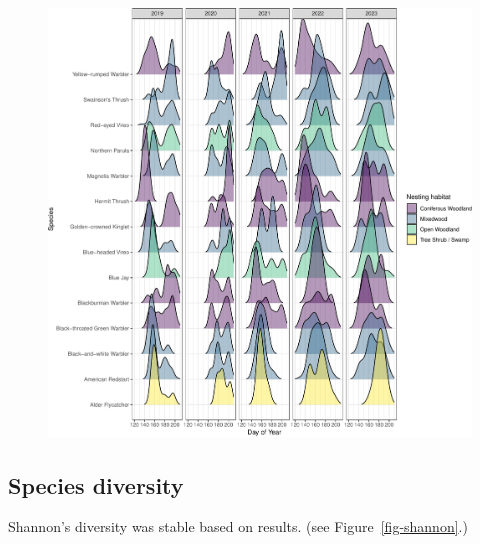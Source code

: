 \documentclass[
  letterpaper,
  DIV=11,
  numbers=noendperiod,
  oneside]{scrartcl}
\begin{document}
\begin{figure}


{\centering \includegraphics{peinp_files/figure-pdf/fig-spp-activity-1.pdf}

}

\end{figure}

\hypertarget{species-diversity}{%
\subsection{Species diversity}\label{species-diversity}}

Shannon's diversity was stable based on results. (see
Figure~\ref{fig-shannon}.)
\end{document}

